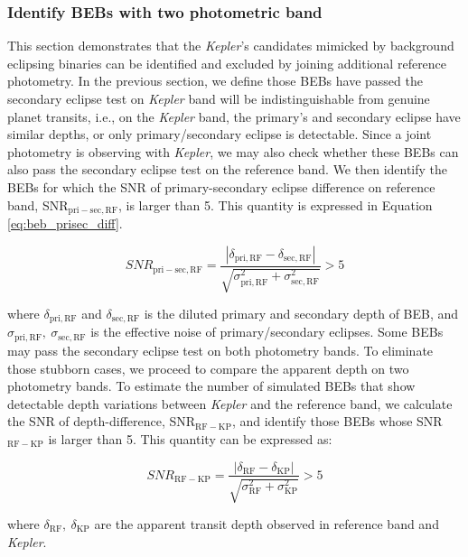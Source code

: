 \documentclass{aastex63}
\begin{document}
	\subsubsection{Identify BEBs with two photometric band}

    This section demonstrates that the \emph{Kepler}'s candidates mimicked by background eclipsing binaries can be identified and excluded by joining additional reference photometry. In the previous section, we define those BEBs have passed the secondary eclipse test on \emph{Kepler} band will be indistinguishable from genuine planet transits, i.e., on the \emph{Kepler} band, the primary's and secondary eclipse have similar depths, or only primary/secondary eclipse is detectable. Since a joint photometry is observing with \emph{Kepler}, we may also check whether these BEBs can also pass the secondary eclipse test on the reference band. We then identify the BEBs for which the SNR of primary-secondary eclipse difference on reference band, SNR$_\mathrm{pri-sec,RF}$, is larger than 5. This quantity is expressed in Equation \ref{eq:beb_prisec_diff}. 
    
    \begin{equation}
    \label{eq:beb_prisec_diff}
        SNR_\mathrm{pri-sec,RF} = \frac{|\delta_\mathrm{pri,RF}-\delta_\mathrm{sec,RF}|}{\sqrt{\sigma_\mathrm{pri,RF}^2+\sigma_\mathrm{sec,RF}^2}} > 5
    \end{equation}

	where $\delta_\mathrm{pri,RF}$ and $\delta_\mathrm{sec,RF}$ is the diluted primary and secondary depth of BEB, and $\sigma_\mathrm{pri,RF},~\sigma_\mathrm{sec,RF}$ is the effective noise of primary/secondary eclipses. Some BEBs may pass the secondary eclipse test on both photometry bands. To eliminate those stubborn cases, we proceed to compare the apparent depth on two photometry bands. To estimate the number of simulated BEBs that show detectable depth variations between \emph{Kepler} and the reference band, we calculate the SNR of depth-difference, SNR$_\mathrm{RF-KP}$, and identify those BEBs whose SNR$_\mathrm{RF-KP}$ is larger than 5. This quantity can be expressed as:
    
    \begin{equation}
    \label{detectabledepthdifference}
        SNR_\mathrm{RF-KP} =  \frac{|\delta_\mathrm{RF}-\delta_\mathrm{KP}|}{\sqrt{\sigma_\mathrm{RF}^2+\sigma_\mathrm{KP}^2}} > 5
    \end{equation}
    
    where $\delta_\mathrm{RF},~\delta_\mathrm{KP}$ are the apparent transit depth observed in reference band and \emph{Kepler}.
    
\end{document}
